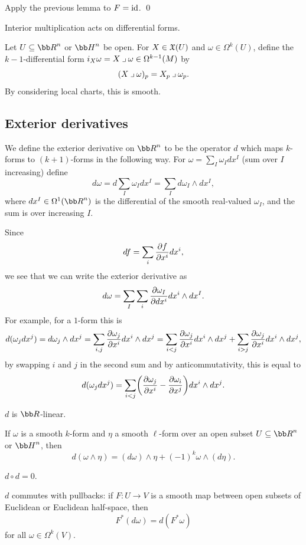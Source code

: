 \bproof

    Apply the previous lemma to $F={\rm id}$.
    \qed

\eproof

Interior multiplication acts on differential forms.

\bdefn

    Let $U\subseteq\bR^n$ or $\bH^n$ be open.
    For $X\in{\frak X}(U)$ and $\omega\in\Omega^k(U)$, define the $k-1$-differential form $i_X\omega=X\imult\omega\in\Omega^{k-1}(M)$ by
    $$ (X\imult\omega)_p = X_p\imult\omega_p . $$
    By considering local charts, this is smooth.

\edefn

\subsection{Exterior derivatives}

\bdefn

    We define the {\emphcolor exterior derivative} on $\bR^n$ to be the operator $d$ which maps $k$-forms to $(k+1)$-forms in the following way.
    For $\omega=\sum_I\omega_Idx^I$ (sum over $I$ increasing) define
    $$ d\omega = d\sum_I\omega_Idx^I = \sum_Id\omega_I\wedge dx^I , $$
    where $dx^I\in\Omega^1(\bR^n)$ is the differential of the smooth real-valued $\omega_I$, and the sum is over increasing $I$.

\edefn

Since
$$ df = \sum_i{{\partial f}\over{\partial x^i}}dx^i, $$
we see that we can write the exterior derivative as
$$ d\omega = \sum_I\sum_i{{\partial \omega_I}\over{\partial dx^i}}dx^i\wedge dx^I . $$
For example, for a $1$-form this is
$$ d(\omega_jdx^j) = d\omega_j\wedge dx^j = \sum_{i,j}{{\partial \omega_j}\over{\partial x^i}}dx^i\wedge dx^j = \sum_{i<j}{{\partial \omega_j}\over{\partial x^i}}dx^i\wedge dx^j + \sum_{i>j}{{\partial \omega_j}\over{\partial x^i}}dx^i\wedge dx^j , $$
by swapping $i$ and $j$ in the second sum and by anticommutativity, this is equal to
$$ d(\omega_jdx^j) = \sum_{i<j}\mathopen{}\mathclose{\left({{\partial \omega_j}\over{\partial x^i}} - {{\partial \omega_i}\over{\partial x^j}}\right)}dx^i\wedge dx^j . $$

\bprop

    \benum
        \item $d$ is $\bR$-linear.
        \item If $\omega$ is a smooth $k$-form and $\eta$ a smooth $\ell$-form over an open subset $U\subseteq\bR^n$ or $\bH^n$, then
        $$ d(\omega\wedge\eta) = (d\omega)\wedge\eta + (-1)^k\omega\wedge(d\eta) . $$
        \item $d\circ d=0$.
        \item $d$ commutes with pullbacks: if $F\colon U\to V$ is a smooth map between open subsets of Euclidean or Euclidean half-space, then
        $$ F^*(d\omega) = d(F^*\omega) $$
        for all $\omega\in\Omega^k(V)$.
    \eenum

